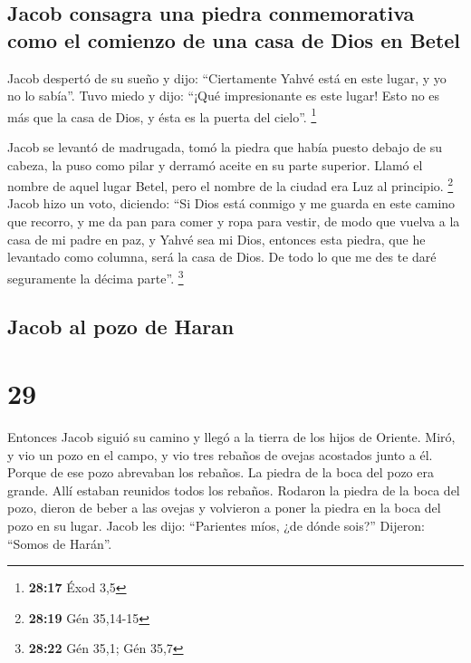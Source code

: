 \hypertarget{jacob-consagra-una-piedra-conmemorativa-como-el-comienzo-de-una-casa-de-dios-en-betel}{%
\subsection{Jacob consagra una piedra conmemorativa como el comienzo de
una casa de Dios en
Betel}\label{jacob-consagra-una-piedra-conmemorativa-como-el-comienzo-de-una-casa-de-dios-en-betel}}

 Jacob despertó de su sueño y dijo: ``Ciertamente Yahvé
está en este lugar, y yo no lo sabía''.  Tuvo miedo y
dijo: ``¡Qué impresionante es este lugar! Esto no es más que la casa de
Dios, y ésta es la puerta del cielo''. \footnote{\textbf{28:17} Éxod 3,5}

 Jacob se levantó de madrugada, tomó la piedra que había
puesto debajo de su cabeza, la puso como pilar y derramó aceite en su
parte superior.  Llamó el nombre de aquel lugar Betel,
pero el nombre de la ciudad era Luz al principio. \footnote{\textbf{28:19}
  Gén 35,14-15}  Jacob hizo un voto, diciendo: ``Si Dios
está conmigo y me guarda en este camino que recorro, y me da pan para
comer y ropa para vestir,  de modo que vuelva a la casa
de mi padre en paz, y Yahvé sea mi Dios,  entonces esta
piedra, que he levantado como columna, será la casa de Dios. De todo lo
que me des te daré seguramente la décima parte''. \footnote{\textbf{28:22}
  Gén 35,1; Gén 35,7}

\hypertarget{jacob-al-pozo-de-haran}{%
\subsection{Jacob al pozo de Haran}\label{jacob-al-pozo-de-haran}}

\hypertarget{section-28}{%
\section{29}\label{section-28}}

 Entonces Jacob siguió su camino y llegó a la tierra de
los hijos de Oriente.  Miró, y vio un pozo en el campo, y
vio tres rebaños de ovejas acostados junto a él. Porque de ese pozo
abrevaban los rebaños. La piedra de la boca del pozo era grande.
 Allí estaban reunidos todos los rebaños. Rodaron la
piedra de la boca del pozo, dieron de beber a las ovejas y volvieron a
poner la piedra en la boca del pozo en su lugar.  Jacob
les dijo: ``Parientes míos, ¿de dónde sois?'' Dijeron: ``Somos de
Harán''.

